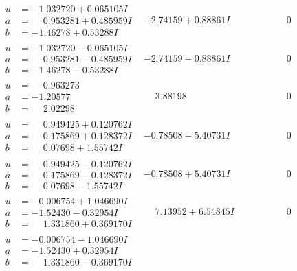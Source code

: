 \documentclass[1p]{elsarticle_modified}
\theoremstyle{definition}
\begin{document}
$$\begin{array}{c|c|c}
\begin{aligned}
u &= -1.032720 + 0.065105 I \\
a &= \phantom{-}0.953281 + 0.485959 I \\
b &= -1.46278 + 0.53288 I\end{aligned}
 & -2.74159 + 0.88861 I & \phantom{-0.000000 } 0 \\ \hline\begin{aligned}
u &= -1.032720 - 0.065105 I \\
a &= \phantom{-}0.953281 - 0.485959 I \\
b &= -1.46278 - 0.53288 I\end{aligned}
 & -2.74159 - 0.88861 I & \phantom{-0.000000 } 0 \\ \hline\begin{aligned}
u &= \phantom{-}0.963273\phantom{ +0.000000I} \\
a &= -1.20577\phantom{ +0.000000I} \\
b &= \phantom{-}2.02298\phantom{ +0.000000I}\end{aligned}
 & \phantom{-}3.88198\phantom{ +0.000000I} & \phantom{-0.000000 } 0 \\ \hline\begin{aligned}
u &= \phantom{-}0.949425 + 0.120762 I \\
a &= \phantom{-}0.175869 + 0.128372 I \\
b &= \phantom{-}0.07698 + 1.55742 I\end{aligned}
 & -0.78508 - 5.40731 I & \phantom{-0.000000 } 0 \\ \hline\begin{aligned}
u &= \phantom{-}0.949425 - 0.120762 I \\
a &= \phantom{-}0.175869 - 0.128372 I \\
b &= \phantom{-}0.07698 - 1.55742 I\end{aligned}
 & -0.78508 + 5.40731 I & \phantom{-0.000000 } 0 \\ \hline\begin{aligned}
u &= -0.006754 + 1.046690 I \\
a &= -1.52430 - 0.32954 I \\
b &= \phantom{-}1.331860 + 0.369170 I\end{aligned}
 & \phantom{-}7.13952 + 6.54845 I & \phantom{-0.000000 } 0 \\ \hline\begin{aligned}
u &= -0.006754 - 1.046690 I \\
a &= -1.52430 + 0.32954 I \\
b &= \phantom{-}1.331860 - 0.369170 I\end{aligned}

\end{array}$$
\end{document}
